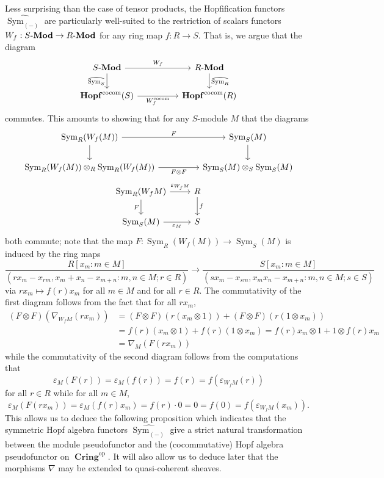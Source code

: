 \documentclass{amsart}
\theoremstyle{definition}
\DeclareMathOperator{\sym}{Sym}
\DeclareMathOperator{\Cring}{\mathbf{Cring}}
\DeclareMathOperator{\op}{op}
\newcommand{\Sym}[1]{\sym_{#1}}
\let\epsilon\varepsilon
\let\epsilon\varepsilon
\newcommand{\Mod}[1]{{#1}\textnormal{-}\mathbf{Mod}}
\numberwithin{equation}{subsection}
\begin{document}
Less surprising than the case of tensor products, the Hopfification functors $\widehat{\Sym{(-)}}$ are particularly well-suited to the restriction of scalars functors $W_f:\Mod{S} \to \Mod{R}$ for any ring map $f:R \to S$. That is, we argue that the diagram
\[
\begin{tikzcd}
\Mod{S} \ar[d, swap]{}{\widehat{\Sym{S}}} \ar[rr]{}{W_f} & & \Mod{R} \ar[d]{}{\widehat{\Sym{R}}} \\
\mathbf{Hopf}^{\operatorname{cocom}}(S) \ar[rr, swap]{}{W_f^{\operatorname{cocom}}} & & \mathbf{Hopf}^{\operatorname{cocom}}(R)
\end{tikzcd}
\]
commutes. This amounts to showing that for any $S$-module $M$ that the diagrams
\[
\begin{tikzcd}
\Sym{R}(W_f(M)) \ar[rr]{}{F} \ar[d, swap]{}{} & & \Sym{S}(M)\ar[d]{}{} \\ 
\Sym{R}(W_f(M)) \otimes_R \Sym{R}(W_f(M)) \ar[rr, swap]{}{F \otimes F} & & \Sym{S}(M) \otimes_S \Sym{S}(M)
\end{tikzcd}
\]
\[
\begin{tikzcd}
\Sym{R}(W_fM) \ar[r]{}{\epsilon_{W_fM}} \ar[d, swap]{}{F} & R \ar[d]{}{f} \\
\Sym{S}(M) \ar[r, swap]{}{\epsilon_M} & S
\end{tikzcd}
\]
both commute; note that the map $F:\Sym{R}(W_f(M)) \to \Sym{S}(M)$ is induced by the ring maps 
\[
\frac{R[x_{m} : m \in M]}{(rx_m-x_{rm}, x_m+x_{n} - x_{m+n}:m,n \in M; r \in R)} \to \frac{S[x_{m}:m \in M]}{(sx_m - x_{sm}, x_mx_n - x_{m+n}:m,n \in M; s \in S)}
\]
 via $rx_m \mapsto f(r)x_m$ for all $m \in M$ and for all $r \in R$. The commutativity of the first diagram follows from the fact that for all $rx_m$,
\begin{align*}
\left(F\otimes F\right)\left(\nabla_{W_fM}(rx_m)\right) &= (F \otimes F)\left(r(x_m \otimes 1)\right) + (F \otimes F)\left(r(1 \otimes x_m)\right) \\
&= f(r)(x_m \otimes 1) + f(r)(1 \otimes x_m) = f(r)x_m \otimes 1 + 1 \otimes f(r)x_m \\
&= \nabla_{M}(F(rx_m))
\end{align*}
while the commutativity of the second diagram follows from the computations that 
\[
\epsilon_M(F(r)) = \epsilon_M(f(r)) = f(r) = f(\epsilon_{W_fM}(r))
\]
for all $r \in R$ while for all $m \in M$,
\[
\epsilon_M(F(rx_m)) = \epsilon_M(f(r)x_m) = f(r)\cdot 0 = 0 = f(0) = f\left(\epsilon_{W_fM}(x_m)\right).
\]
This allows us to deduce the following proposition which indicates that the symmetric Hopf algebra functors $\widehat{\Sym{(-)}}$ give a strict natural transformation between the module pseudofunctor and the (cocommutative) Hopf algebra pseudofunctor on $\Cring^{\op}$. It will also allow us to deduce later that the morphisms $\nabla$ may be extended to quasi-coherent sheaves.
\end{document}
